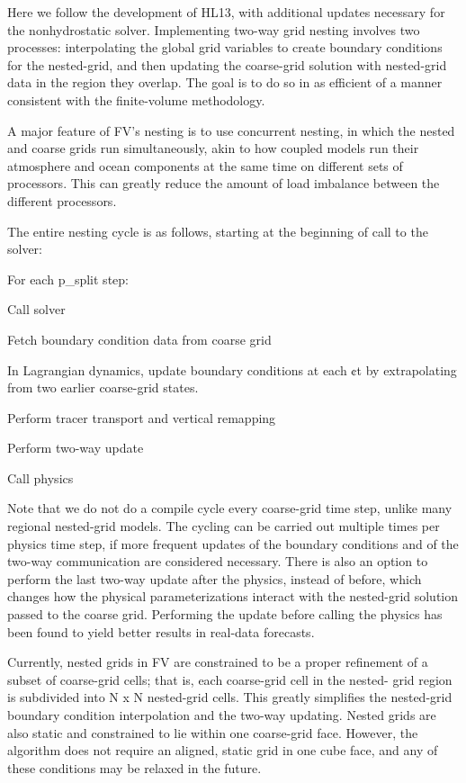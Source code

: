 Here we follow the development of H\-L13, with additional updates necessary for the nonhydrostatic solver. Implementing two-\/way grid nesting involves two processes\-: interpolating the global grid variables to create boundary conditions for the nested-\/grid, and then updating the coarse-\/grid solution with nested-\/grid data in the region they overlap. The goal is to do so in as efficient of a manner consistent with the finite-\/volume methodology.

A major feature of F\-V’s nesting is to use concurrent nesting, in which the nested and coarse grids run simultaneously, akin to how coupled models run their atmosphere and ocean components at the same time on different sets of processors. This can greatly reduce the amount of load imbalance between the different processors.

The entire nesting cycle is as follows, starting at the beginning of call to the solver\-:


\begin{DoxyItemize}
\item For each {\ttfamily p\-\_\-split} step\-:
\begin{DoxyItemize}
\item Call solver
\item Fetch boundary condition data from coarse grid
\item In Lagrangian dynamics, update boundary conditions at each ¢t by extrapolating from two earlier coarse-\/grid states.
\item Perform tracer transport and vertical remapping
\item Perform two-\/way update
\end{DoxyItemize}
\item Call physics
\end{DoxyItemize}

Note that we do not do a compile cycle every coarse-\/grid time step, unlike many regional nested-\/grid models. The cycling can be carried out multiple times per physics time step, if more frequent updates of the boundary conditions and of the two-\/way communication are considered necessary. There is also an option to perform the last two-\/way update after the physics, instead of before, which changes how the physical parameterizations interact with the nested-\/grid solution passed to the coarse grid. Performing the update before calling the physics has been found to yield better results in real-\/data forecasts.

Currently, nested grids in F\-V are constrained to be a proper refinement of a subset of coarse-\/grid cells; that is, each coarse-\/grid cell in the nested-\/ grid region is subdivided into N x N nested-\/grid cells. This greatly simplifies the nested-\/grid boundary condition interpolation and the two-\/way updating. Nested grids are also static and constrained to lie within one coarse-\/grid face. However, the algorithm does not require an aligned, static grid in one cube face, and any of these conditions may be relaxed in the future.

